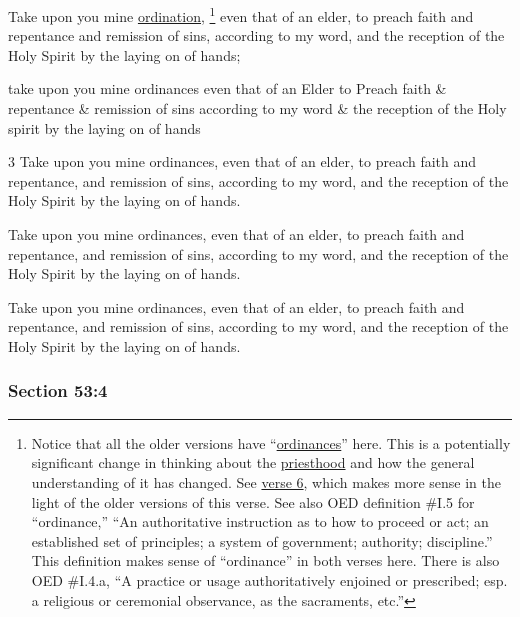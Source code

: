 		Take upon you mine \hyperref[ORDINATION]{ordination},%
			\footnote{%
				Notice that all the older versions have ``\hyperref[ORDINANCE]{ordinances}'' here. This is a potentially significant change in thinking about the \hyperref[PRIESTHOOD]{priesthood} and how the general understanding of it has changed. See \hyperref[DC53-6]{verse 6}, which makes more sense in the light of the older versions of this verse. See also OED definition \#I.5 for ``ordinance,'' ``An authoritative instruction as to how to proceed or act; an established set of principles; a system of government; authority; discipline.'' This definition makes sense of ``ordinance'' in both verses here. There is also OED \#I.4.a, ``A practice or usage authoritatively enjoined or prescribed; esp. a religious or ceremonial observance, as the sacraments, etc.''
				}
		even that of an elder, to preach faith and repentance and remission of sins, according to my word, and the reception of the Holy Spirit by the laying on of hands;

		\begin{framed}
		\scriptsize
			\begin{compactdesc}
				\item[JSP] take upon you mine ordinances even that of an Elder to Preach faith \& repentance \& remission of sins according to my word \& the reception of the Holy spirit by the laying on of hands
				\item[BC] 3 Take upon you mine ordinances, even that of an elder, to preach faith and repentance, and remission of sins, according to my word, and the reception of the Holy Spirit by the laying on of hands.
				\item[DC 1835] Take upon you mine ordinances, even that of an elder, to preach faith and repentance, and remission of sins, according to my word, and the reception of the Holy Spirit by the laying on of hands.
				\item[DC 1844] Take upon you mine ordinances, even that of an elder, to preach faith and repentance, and remission of sins, according to my word, and the reception of the Holy Spirit by the laying on of hands.
			\end{compactdesc}
		\end{framed}

	\subsubsection{Section 53:4} %
		\label{DC53-4}

